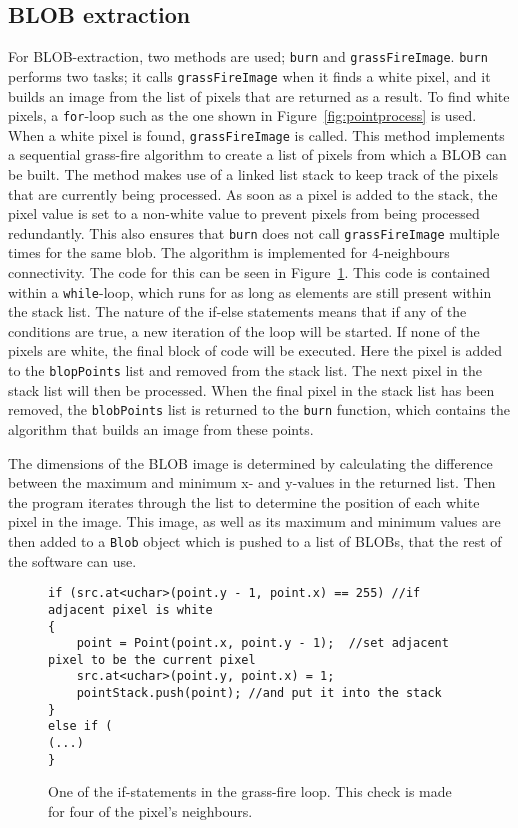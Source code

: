 \subsection{BLOB extraction}
For BLOB-extraction, two methods are used; \texttt{burn} and \texttt{grassFireImage}. \texttt{burn} performs two tasks; it calls \texttt{grassFireImage} when it finds a white pixel, and it builds an image from the list of pixels that are returned as a result. To find white pixels, a \texttt{for}-loop such as the one shown in Figure~\ref{fig:pointprocess} is used. When a white pixel is found, \texttt{grassFireImage} is called. This method implements a sequential grass-fire algorithm to create a list of pixels from which a BLOB can be built. The method makes use of a linked list stack to keep track of the pixels that are currently being processed. As soon as a pixel is added to the stack, the pixel value is set to a non-white value to prevent pixels from being processed redundantly. This also ensures that \texttt{burn} does not call \texttt{grassFireImage} multiple times for the same blob. The algorithm is implemented for 4-neighbours connectivity. The code for this can be seen in Figure~\ref{fig:grassFireIf}. This code is contained within a \texttt{while}-loop, which runs for as long as elements are still present within the stack list. The nature of the if-else statements means that if any of the conditions are true, a new iteration of the loop will be started. If none of the pixels are white, the final block of code will be executed. Here the pixel is added to the \texttt{blopPoints} list and removed from the stack list. The next pixel in the stack list will then be processed. When the final pixel in the stack list has been removed, the \texttt{blobPoints} list is returned to the \texttt{burn} function, which contains the algorithm that builds an image from these points.

The dimensions of the BLOB image is determined by calculating the difference between the maximum and minimum x- and y-values in the returned list. Then the program iterates through the list to determine the position of each white pixel in the image. This image, as well as its maximum and minimum values are then added to a \texttt{Blob} object which is pushed to a list of BLOBs, that the rest of the software can use.  

\begin{figure}
\begin{lstlisting}
if (src.at<uchar>(point.y - 1, point.x) == 255) //if adjacent pixel is white 
{
	point = Point(point.x, point.y - 1);  //set adjacent pixel to be the current pixel
	src.at<uchar>(point.y, point.x) = 1;
	pointStack.push(point); //and put it into the stack
}
else if (
(...)
}
\end{lstlisting}
\caption{One of the if-statements in the grass-fire loop. This check is made for four of the pixel's neighbours. \label{fig:grassFireIf}}
\end{figure}

